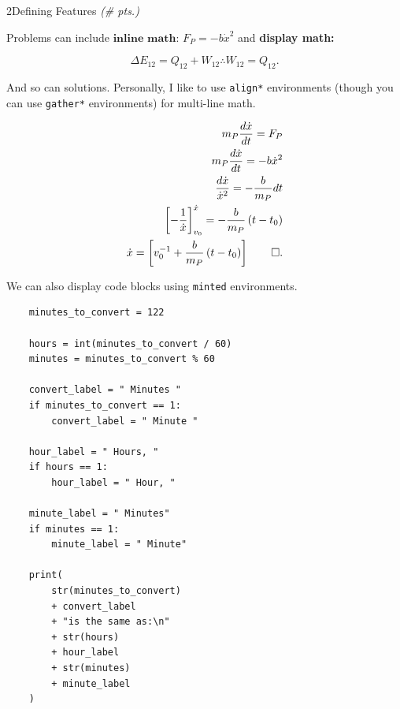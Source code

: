 \begin{hwkProblem}{2}{Defining Features \textit{(\# pts.)}} \label{hwk:p02}

    Problems can include \( \textbf{inline math: } F_{P} = - b \dot{x}^{2} \) and \textbf{display math:}

    \[
        \Delta E_{12} = Q_{12} + W_{12} \therefore W_{12} = Q_{12} .
    \]

    \hwkSol{} \label{hwk:s02}

    And so can solutions. Personally, I like to use \texttt{align*} environments (though you can use \texttt{gather*} environments) for multi-line math.

    \begin{align*}
        m_{P} \frac{d\dot{x}}{dt}                             = F_{P}                                        \\
        m_{P} \frac{d\dot{x}}{dt}                             = -b\dot{x}^{2}                                \\
        \frac{d\dot{x}}{\dot{x}^2}                            = - \frac{b}{m_{P}} dt                         \\
        {\left[ - \frac{1}{\dot{x}} \right]}^{\dot{x}}_{v_{0}}  = - \frac{b}{m_{P}} \left( t - t_{0} \right) \\
        \dot{x}                                               = \left[ v_{0}^{-1} + \frac{b}{m_{P}} \left( t - t_{0} \right) \right] \qed .
    \end{align*}

    \hwkCode{} \label{code:s02}

    We can also display code blocks using \texttt{minted} environments.

    \begin{verbatim}
	minutes_to_convert = 122

	hours = int(minutes_to_convert / 60)
	minutes = minutes_to_convert % 60

	convert_label = " Minutes "
	if minutes_to_convert == 1:
	    convert_label = " Minute "

	hour_label = " Hours, "
	if hours == 1:
	    hour_label = " Hour, "

	minute_label = " Minutes"
	if minutes == 1:
	    minute_label = " Minute"

	print(
	    str(minutes_to_convert)
	    + convert_label
	    + "is the same as:\n"
	    + str(hours)
	    + hour_label
	    + str(minutes)
	    + minute_label
	)
    \end{verbatim}

\end{hwkProblem}


